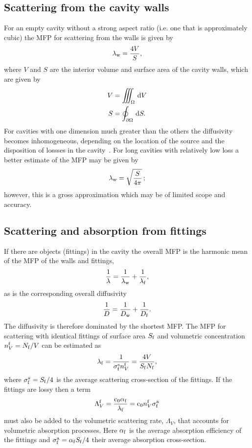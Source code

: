 \documentclass[a4paper]{article}
\numberwithin{equation}{section}
\providecommand\oiint{\oint}
\begin{document}
\subsection[Scattering from the cavity walls]{Scattering from the cavity walls}
\label{sc:sum:walls}

For an empty cavity without a strong aspect ratio (i.e. one that is approximately cubic) 
the MFP for scattering from the walls is given by~\citep{Navarro2015}
\begin{align}
\lambda_{\mathrm{w}} = \frac{4V}{S},
\end{align}
where $V$ and $S$ are the interior volume and surface area of the cavity
walls, which are given by
\begin{align}
V &= \iiint_{\Omega }\dif{V} \\
S &= \oiint_{\partial\Omega }\dif{S} .
\end{align}
For cavities with one dimension much greater than the others the diffusivity becomes inhomogeneous, 
depending on the location of the source and the disposition of lossses in the cavity~\citep{Visentin2012,Visentin2015}.
For long cavities with relatively low loss a better estimate of the MFP may be given by
\begin{align}
\lambda_{\mathrm{w}} = \sqrt{\frac{S}{4\pi}}\,;
\end{align}
however, this is a gross approximation which may be of limited scope and accuracy.

\subsection[Scattering and absorption from fittings]{Scattering and absorption from fittings}
\label{sc:sum:fit}

If there are objects (fittings) in the cavity the overall MFP is the harmonic
mean of the MFP of the walls and fittings,
\begin{align}
\label{eq:harmmean}
\frac{1}{\lambda} = \frac{1}{\lambda_{\mathrm{w}}} + \frac{1}{\lambda_{\mathrm{f}}},
\end{align}
as is the corresponding overall diffusivity~\citep{Valeau2007}
\begin{align}
\frac{1}{D} = \frac{1}{D_{\mathrm{w}}} + \frac{1}{D_{\mathrm{f}}}.
\end{align}
The diffusivity is therefore dominated by the shortest MFP. The MFP for
scattering with identical fittings of surface area $S_{\mathrm{f}}$ and volumetric
concentration $n_V^{\mathrm{f}}=N_{\mathrm{f}}/V$ can be estimated as~\citep{Valeau2007}
\begin{align}
\lambda_{\mathrm{f}} = \frac{1}{\sigma_{\mathrm{f}}^{\mathrm{s}} n_V^{\mathrm{f}}} = \frac{4V}{S_{\mathrm{f}} N_{\mathrm{f}}},
\end{align}
where $\sigma_{\mathrm{f}}^s=S_{\mathrm{f}}/4$ is the average scattering cross-section of the
fittings. If the fittings are lossy then a term
\begin{align}
\Lambda_V^{\mathrm{f}} = \frac{\mathrm{c}_0\alpha_{\mathrm{f}}}{\lambda_{\mathrm{f}}} = \mathrm{c}_0 n_V^{\mathrm{f}} \sigma_{\mathrm{f}}^{\mathrm{a}}
\end{align}
must also be added to the volumetric scattering rate, $\Lambda_V$, that accounts
for volumetric absorption processes. Here $\alpha_{\mathrm{f}}$ is the average
absorption efficiency of the fittings and $\sigma_{\mathrm{f}}^{\mathrm{a}}=\alpha_{\mathrm{f}} S_{\mathrm{f}}/4$ their
average absorption cross-section.
\end{document}
